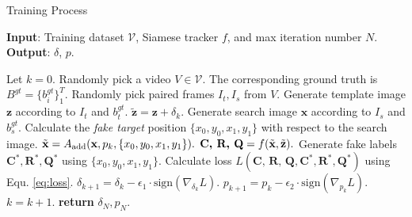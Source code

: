 \documentclass[journal]{IEEEtran}
\begin{document}
\begin{algorithm}[tb]
  \small
  \caption{Training Process}
  \label{alg:algorithm}
  \textbf{Input}: Training dataset $\mathcal{V}$, Siamese tracker $f$, and max iteration number $N$.\\
  \textbf{Output}: $\delta$, $p$.
  \begin{algorithmic}[1] %
  \STATE Let $k = 0$.
  \STATE Randomly pick a video $V\in \mathcal{V}$. The corresponding ground truth is $B^{gt}=\{b^{gt}_i\}^T_1$.
  \STATE Randomly pick paired frames $I_t, I_s$ from $V$.
  \STATE Generate template image $\textbf{z}$ according to $I_t$ and $b^{gt}_t$.
  \STATE $\tilde{\textbf{z}} = \textbf{z} + \delta_k.$
  \STATE Generate search image $\textbf{x}$ according to $I_s$ and $b^{gt}_s$.
  \STATE Calculate the \textit{fake target} position $\{x_0, y_0, x_1, y_1\}$ with respect to the search image.
  \STATE $\tilde{\textbf x} = A_{\text{add}}(\textbf x, p_k, \{x_0, y_0, x_1, y_1\}).$
  \STATE $\textbf{C, R, Q} = f(\tilde {\textbf x}, \tilde{\textbf z}).$
  \STATE Generate fake labels $\textbf{C}^*,\textbf{R}^*,\textbf{Q}^*$ using $\{x_0, y_0, x_1, y_1\}$.
  \STATE Calculate loss $L(\textbf{C, R, Q}, \textbf{C}^*, \textbf{R}^*, \textbf{Q}^*)$ using Equ. \ref{eq:loss}.
  \STATE $\delta_{k+1} = \delta_{k} - \epsilon_1 \cdot \text{sign}(\nabla_{\delta_k}L).$
  \STATE $p_{k+1} = p_{k} - \epsilon_2 \cdot \text{sign}(\nabla_{p_k}L).$
  \STATE $k = k + 1.$
  \ENDWHILE
  \STATE \textbf{return} $\delta_N, p_N.$
  \end{algorithmic}
  \label{alg}
\end{algorithm}
  
\end{document}
